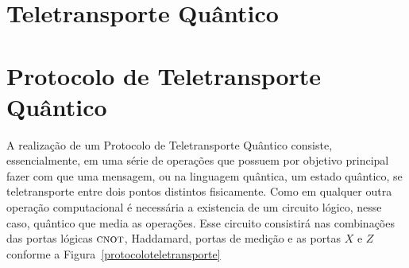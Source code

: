 \section{Teletransporte Quântico}
%
%
%


\section{Protocolo de Teletransporte Quântico}

A realização de um Protocolo de Teletransporte Quântico consiste, essencialmente, em uma série de operações que possuem por objetivo principal fazer com que uma mensagem, ou na linguagem quântica, um estado quântico, se teletransporte entre dois pontos distintos fisicamente.
Como em qualquer outra operação computacional é necessária a existencia de um circuito lógico, nesse caso, quântico que media as operações. Esse circuito consistirá nas combinações das portas lógicas \(\operatorname{\textsc{cnot}}\), Haddamard, portas de medição e as portas \(X\) e \(Z\) conforme a Figura~\ref{protocoloteletransporte}

